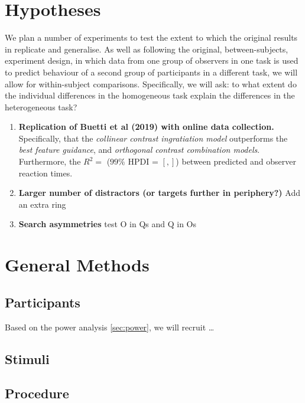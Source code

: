 \documentclass[smallextended]{svjour3}       %
\begin{document}
\section{Hypotheses}

We plan a number of experiments to test the extent to which the original results in \cite{buetti2019predicting} replicate and generalise. As well as following the original, between-subjects, experiment design, in which data from one group of observers in one task is used to predict behaviour of a second group of participants in a different task, we will allow for within-subject comparisons. Specifically, we will ask: to what extent do the individual differences in the homogeneous task explain the differences in the heterogeneous task? 

\begin{enumerate}
\item \textbf{Replication of Buetti et al (2019) with online data collection.} Specifically, that the \textit{collinear contrast ingratiation model} outperforms the \textit{best feature guidance}, and \textit{orthogonal contrast combination models}.  Furthermore, the $R^2 = $ ($99\%$ HPDI = $[, ]$) between predicted and observer reaction times.\\
\item \textbf{Larger number of distractors (or targets further in periphery?)} Add an extra ring \\ 
\item \textbf{Search asymmetries} test O in Qs and Q in Os \\
\end{enumerate}

\section{General Methods}

\subsection{Participants}

Based on the power analysis \ref{sec:power}, we will recruit \ldots

\subsection{Stimuli}

\subsection{Procedure}
\end{document}
